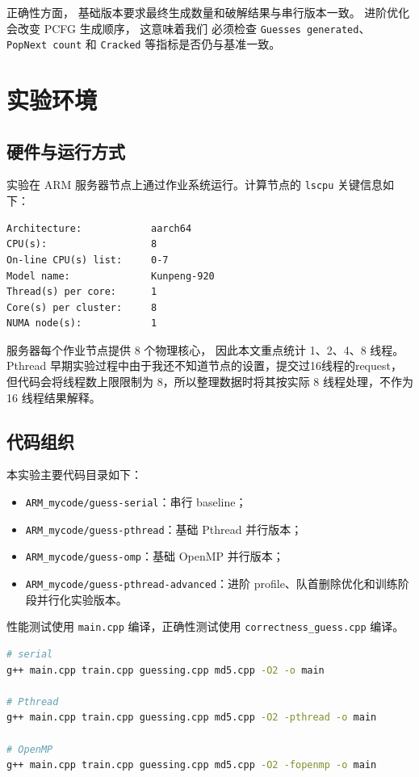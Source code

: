 \documentclass[UTF8,a4paper,12pt]{ctexart}
\begin{document}
正确性方面，
基础版本要求最终生成数量和破解结果与串行版本一致。
进阶优化会改变 PCFG 生成顺序，
这意味着我们
必须检查 \texttt{Guesses generated}、
\texttt{PopNext count} 和 \texttt{Cracked} 
等指标是否仍与基准一致。

\section{实验环境}

\subsection{硬件与运行方式}

实验在 ARM 服务器节点上通过作业系统运行。计算节点的 \texttt{lscpu} 关键信息如下：

\begin{lstlisting}
Architecture:            aarch64
CPU(s):                  8
On-line CPU(s) list:     0-7
Model name:              Kunpeng-920
Thread(s) per core:      1
Core(s) per cluster:     8
NUMA node(s):            1
\end{lstlisting}

服务器每个作业节点提供 8 个物理核心，
因此本文重点统计 1、2、4、8 线程。
Pthread 早期实验过程中由于我还不知道节点的设置，提交过16线程的request，
但代码会将线程数上限限制为 8，所以整理数据时将其按实际 8 线程处理，不作为 16 线程结果解释。

\subsection{代码组织}

本实验主要代码目录如下：

\begin{itemize}
  \item \texttt{ARM\_mycode/guess-serial}：串行 baseline；
  \item \texttt{ARM\_mycode/guess-pthread}：基础 Pthread 并行版本；
  \item \texttt{ARM\_mycode/guess-omp}：基础 OpenMP 并行版本；
  \item \texttt{ARM\_mycode/guess-pthread-advanced}：进阶 profile、队首删除优化和训练阶段并行化实验版本。
\end{itemize}

性能测试使用 \texttt{main.cpp} 编译，正确性测试使用 \texttt{correctness\_guess.cpp} 编译。

\begin{lstlisting}[language=bash]
# serial
g++ main.cpp train.cpp guessing.cpp md5.cpp -O2 -o main

# Pthread
g++ main.cpp train.cpp guessing.cpp md5.cpp -O2 -pthread -o main

# OpenMP
g++ main.cpp train.cpp guessing.cpp md5.cpp -O2 -fopenmp -o main
\end{lstlisting}
\end{document}
